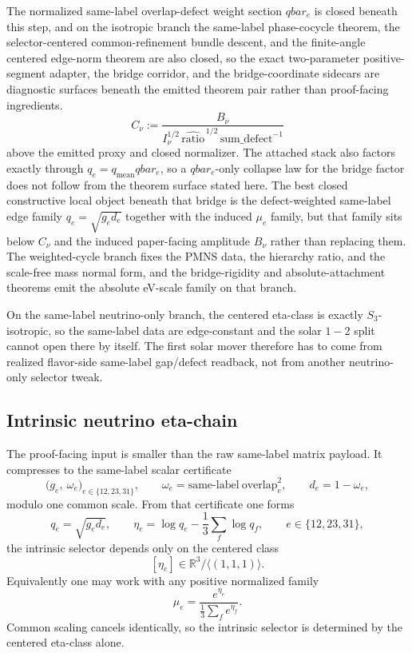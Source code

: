 \documentclass[11pt]{article}
\begin{document}
The normalized same-label overlap-defect weight section \(qbar_e\) is closed beneath
this step, and on the isotropic branch the same-label phase-cocycle theorem, the
selector-centered common-refinement bundle descent, and the finite-angle centered edge-norm
theorem are also closed, so the exact two-parameter positive-segment adapter, the bridge corridor, and the bridge-coordinate sidecars are diagnostic surfaces beneath the emitted theorem pair rather than proof-facing ingredients.
\[
C_\nu:=\frac{B_\nu}{I_\nu^{1/2}\,\widehat{\mathrm{ratio}}^{\,1/2}\,\mathrm{sum\_defect}^{-1}}
\]
above the emitted proxy and closed normalizer. The attached stack also factors exactly through
\(q_e = q_{\mathrm{mean}} qbar_e\), so a \(qbar_e\)-only collapse law for the bridge factor does
not follow from the theorem surface stated here. The best closed constructive local object beneath that bridge is the
defect-weighted same-label edge family \(q_e=\sqrt{g_e d_e}\) together with the induced
\(\mu_e\) family, but that family sits below \(C_\nu\) and the induced paper-facing amplitude \(B_\nu\) rather than replacing them.
The weighted-cycle branch fixes the PMNS data, the hierarchy ratio, and the
scale-free mass normal form, and the bridge-rigidity and absolute-attachment theorems emit the
absolute eV-scale family on that branch.

On the same-label neutrino-only branch, the centered eta-class is exactly \(S_3\)-isotropic, so
the same-label data are edge-constant and the solar \(1\!-\!2\) split cannot open there by itself.
The first solar mover therefore has to come from realized flavor-side same-label gap/defect
readback, not from another neutrino-only selector tweak.

\subsection{Intrinsic neutrino eta-chain}

The proof-facing input is smaller than the raw same-label matrix payload. It compresses to the
same-label scalar certificate
\[
\bigl(g_e,\ \omega_e\bigr)_{e\in\{12,23,31\}},
\qquad
\omega_e=\mathrm{same\text{-}label\ overlap}_e^2,
\qquad
d_e=1-\omega_e,
\]
modulo one common scale. From that certificate one forms
\[
q_e=\sqrt{g_e d_e},
\qquad
\eta_e=\log q_e-\frac13\sum_f \log q_f,
\qquad
e\in\{12,23,31\},
\]
the intrinsic selector depends only on the centered class
\[
[\eta_e]\in \mathbb{R}^3/\langle(1,1,1)\rangle.
\]
Equivalently one may work with any positive normalized family
\[
\mu_e=\frac{e^{\eta_e}}{\frac13\sum_f e^{\eta_f}}.
\]
Common scaling cancels identically, so the intrinsic selector is determined by the centered
eta-class alone.
\end{document}
